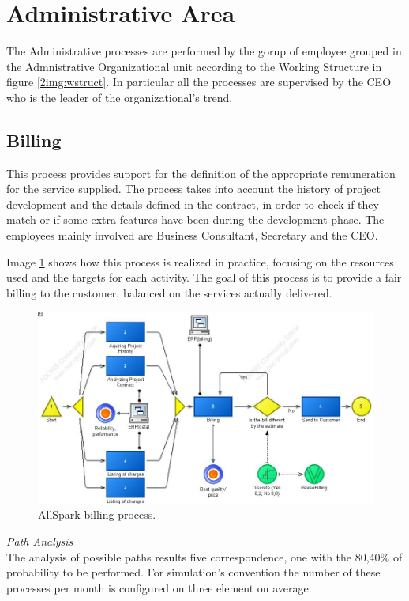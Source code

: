 \section{Administrative Area}
The Administrative processes are performed by the gorup of employee grouped in the Admnistrative Organizational unit according to the Working Structure in figure \ref{2img:wstruct}. In particular all the processes are supervised by the CEO who is the leader of the organizational's trend.


\subsection{Billing}
This process provides support for the definition of the appropriate
remuneration for the service supplied.
The process takes into account the history of project development and the details defined in the contract, in order to check if they match or if some extra features have been during the development phase. The employees mainly involved are Business Consultant, Secretary and the CEO.

Image \ref{2img:billing} shows how this process is realized in practice, focusing on the resources used and the targets for each activity. The goal of this process is to provide a fair billing to the customer, balanced on the services actually delivered.\\

\begin{figure}[ht!]
\begin{centering}
\includegraphics[scale=0.50, angle=90]{assign2/adonis/imgs/billing.jpg}
\caption{AllSpark billing process.}
\label{2img:billing}
\end{centering}
\end{figure}

\noindent
\emph{Path Analysis}\\
The analysis of possible paths results five correspondence, one with the 80,40\% of probability to be performed. For simulation's convention the number of these processes per month is configured on three element on average.

